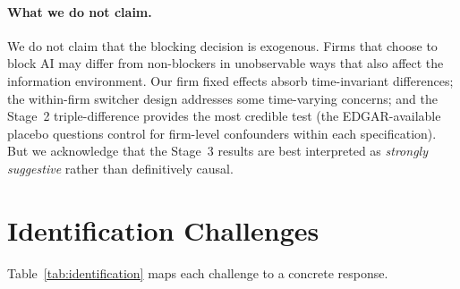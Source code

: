 \documentclass[12pt,a4paper]{article}
\begin{document}
\paragraph{What we do not claim.} We do not claim that the blocking decision is exogenous. Firms that choose to block AI may differ from non-blockers in unobservable ways that also affect the information environment. Our firm fixed effects absorb time-invariant differences; the within-firm switcher design addresses some time-varying concerns; and the Stage~2 triple-difference provides the most credible test (the EDGAR-available placebo questions control for firm-level confounders within each specification). But we acknowledge that the Stage~3 results are best interpreted as \emph{strongly suggestive} rather than definitively causal.

\section{Identification Challenges}

Table~\ref{tab:identification} maps each challenge to a concrete response.
\end{document}
